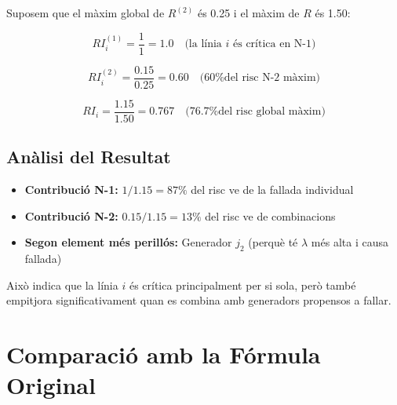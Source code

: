 \documentclass[11pt,a4paper]{article}
\begin{document}
Suposem que el màxim global de $R^{(2)}$ és 0.25 i el màxim de $R$ és 1.50:

\begin{equation}
RI_i^{(1)} = \frac{1}{1} = 1.0 \quad \text{(la línia } i \text{ és crítica en N-1)}
\end{equation}

\begin{equation}
RI_i^{(2)} = \frac{0.15}{0.25} = 0.60 \quad \text{(60\% del risc N-2 màxim)}
\end{equation}

\begin{equation}
RI_i = \frac{1.15}{1.50} = 0.767 \quad \text{(76.7\% del risc global màxim)}
\end{equation}

\subsection{Anàlisi del Resultat}

\begin{itemize}
    \item \textbf{Contribució N-1:} $1 / 1.15 = 87\%$ del risc ve de la fallada individual
    \item \textbf{Contribució N-2:} $0.15 / 1.15 = 13\%$ del risc ve de combinacions
    \item \textbf{Segon element més perillós:} Generador $j_2$ (perquè té $\lambda$ més alta i causa fallada)
\end{itemize}

Això indica que la línia $i$ és crítica principalment per si sola, però també empitjora significativament quan es combina amb generadors propensos a fallar.

\section{Comparació amb la Fórmula Original}
\end{document}

